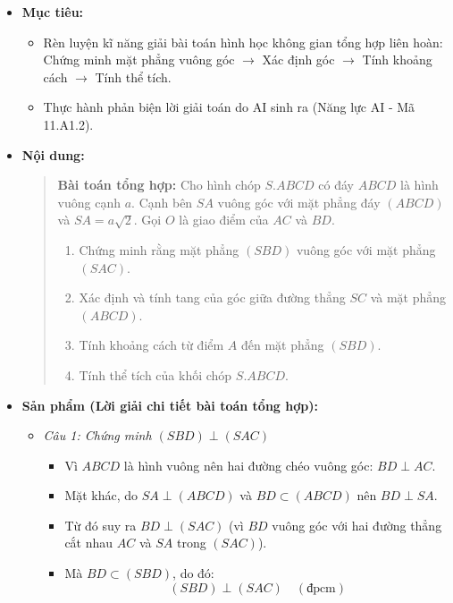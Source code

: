 \documentclass[12pt, a4paper]{article}
\begin{document}
\begin{itemize}[leftmargin=1.2cm]
    \item[a)] \textbf{Mục tiêu:}
    \begin{itemize}[leftmargin=0.6cm]
        \item Rèn luyện kĩ năng giải bài toán hình học không gian tổng hợp liên hoàn: Chứng minh mặt phẳng vuông góc $\to$ Xác định góc $\to$ Tính khoảng cách $\to$ Tính thể tích.
        \item Thực hành phản biện lời giải toán do AI sinh ra (Năng lực AI - Mã 11.A1.2).
    \end{itemize}

    \item[b)] \textbf{Nội dung:}
    \begin{quote}
        \textbf{Bài toán tổng hợp:} Cho hình chóp $S.ABCD$ có đáy $ABCD$ là hình vuông cạnh $a$. Cạnh bên $SA$ vuông góc với mặt phẳng đáy $(ABCD)$ và $SA = a\sqrt{2}$. Gọi $O$ là giao điểm của $AC$ và $BD$.
        \begin{enumerate}[leftmargin=0.6cm]
            \item Chứng minh rằng mặt phẳng $(SBD)$ vuông góc với mặt phẳng $(SAC)$.
            \item Xác định và tính tang của góc giữa đường thẳng $SC$ và mặt phẳng $(ABCD)$.
            \item Tính khoảng cách từ điểm $A$ đến mặt phẳng $(SBD)$.
            \item Tính thể tích của khối chóp $S.ABCD$.
        \end{enumerate}
    \end{quote}

    \item[c)] \textbf{Sản phẩm (Lời giải chi tiết bài toán tổng hợp):}
    \begin{itemize}[leftmargin=0.6cm]
        \item \textit{Câu 1: Chứng minh $(SBD) \perp (SAC)$}
        \begin{itemize}
            \item Vì $ABCD$ là hình vuông nên hai đường chéo vuông góc: $BD \perp AC$.
            \item Mặt khác, do $SA \perp (ABCD)$ và $BD \subset (ABCD)$ nên $BD \perp SA$.
            \item Từ đó suy ra $BD \perp (SAC)$ (vì $BD$ vuông góc với hai đường thẳng cắt nhau $AC$ và $SA$ trong $(SAC)$).
            \item Mà $BD \subset (SBD)$, do đó:
            $$(SBD) \perp (SAC) \quad (\text{đpcm})$$
        \end{itemize}


\end{itemize}
\end{itemize}
\end{document}
